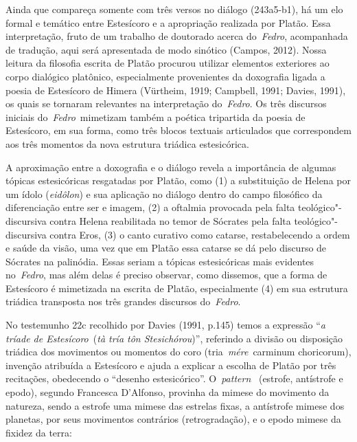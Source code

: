  

Ainda que compareça somente com três versos no diálogo (243a5-b1), há um
elo formal e temático entre Estesícoro e a apropriação realizada por
Platão. Essa interpretação, fruto de um trabalho de doutorado acerca
do~\emph{Fedro}, acompanhada de tradução, aqui será apresentada de modo
sinótico (Campos, 2012). Nossa leitura da filosofia escrita de Platão
procurou utilizar elementos exteriores ao corpo dialógico platônico,
especialmente provenientes da doxografia ligada a poesia de Estesícoro
de Himera (Vürtheim, 1919; Campbell, 1991; Davies, 1991), os quais se
tornaram relevantes na interpretação do~\emph{Fedro}. Os três discursos
iniciais do~\emph{Fedro}~mimetizam também a poética tripartida da poesia
de Estesícoro, em sua forma, como três blocos textuais articulados que
correspondem aos três momentos da nova estrutura triádica estesicórica.

A aproximação entre a doxografia e o diálogo revela a importância de
algumas tópicas estesicóricas resgatadas por Platão, como (1) a
substituição de Helena por um ídolo (\emph{eidôlon}) e sua aplicação no
diálogo dentro do campo filosófico da diferenciação entre ser e imagem,
(2) a oftalmia provocada pela falta teológico"-discursiva contra Helena
reabilitada no temor de Sócrates pela falta teológico"-discursiva contra
Eros, (3) o canto curativo como catarse, restabelecendo a ordem e saúde
da visão, uma vez que em Platão essa catarse se dá pelo discurso de
Sócrates na palinódia. Essas seriam a tópicas estesicóricas mais
evidentes no~\emph{Fedro}, mas além delas é preciso observar, como
dissemos, que a forma de Estesícoro é mimetizada na escrita de Platão,
especialmente (4) em sua estrutura triádica transposta nos três grandes
discursos do~\emph{Fedro}.

No testemunho 22c recolhido por Davies (1991, p.145) temos a expressão
``\emph{a tríade de Estesícoro}~(\emph{tà tría tôn Stesichórou})'',
referindo a divisão ou disposição triádica dos movimentos ou momentos do
coro (tria~\emph{mére}~carminum choricorum), invenção atribuída a
Estesícoro e ajuda a explicar a escolha de Platão por três recitações,
obedecendo o ``desenho estesicórico''. O~\emph{pattern}~ (estrofe,
antístrofe e epodo), segundo Francesca D'Alfonso, provinha da mimese do
movimento da natureza, sendo a estrofe uma mimese das estrelas fixas, a
antístrofe mimese dos planetas, por seus movimentos contrários
(retrogradação), e o epodo mimese da fixidez da terra:

 

